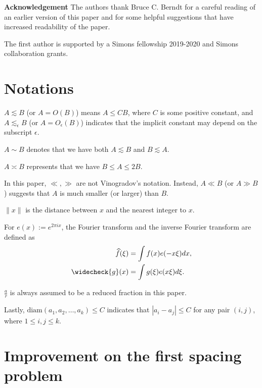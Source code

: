 \documentclass[11pt]{amsart}
\numberwithin{equation}{section}
\theoremstyle{definition}
\theoremstyle{proposition}
\begin{document}
{\bf Acknowledgement} The authors thank Bruce C. Berndt for a careful reading of an earlier version of this paper and for some helpful suggestions that have increased readability of the paper.  

The first author is supported by a Simons fellowship 2019-2020 and Simons collaboration grants.  


\section{Notations} \label{notations}

$A\lesssim B$ (or $A=O(B)$) means $A \le C B$,  where $C$ is some positive constant, and $A\lesssim_\epsilon B$ (or $A=O_\epsilon(B)$) indicates that the implicit constant may depend on the subscript $\epsilon$.  

$A\sim B$ denotes that we have both $A\lesssim B$ and $B\lesssim A$. 

$A\asymp B$ represents that we have $B\le A\le 2B$. 

In this paper, $\ll,\gg$ are not Vinogradov's notation.  Instead, $A\ll B$ (or $A\gg B$) suggests that $A$ is much smaller (or larger) than $B$. 

$\|x\|$ is the distance between $x$ and the nearest integer to $x$. 

For $e(x):=e^{2\pi i x}$, the Fourier transform and the inverse Fourier transform are defined as 
\[
\begin{split}
\widehat{f}(\xi)& =\int f(x)e(-x\xi) dx, 
\\ \widecheck {g}(x) &= \int g(\xi) e(x\xi) d\xi. 
\end{split}
\]

$\frac{a}{r}$ is always assumed to be a reduced fraction in this paper.

Lastly, $\text{diam}(a_1,a_2,\dots, a_k)\le C$ indicates that $|a_i-a_j|\le C$ for any pair $(i,j)$, where $1\le i, j\le k$.   

\section{Improvement on the first spacing problem} \label{first spacing problem}
\end{document}
